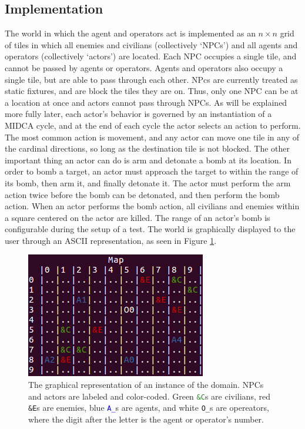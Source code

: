 \documentclass[letterpaper,11pt]{article}
\newcommand{\code}[1]{\texttt{#1}}
\begin{document}
	\subsection{Implementation}
	The world in which the agent and operators act is implemented as an $n \times n$ grid of tiles in which all enemies and civilians (collectively `NPCs') and all agents and operators (collectively `actors') are located. Each NPC occupies a single tile, and cannot be passed by agents or operators. Agents and operators also occupy a single tile, but are able to pass through each other. NPcs are currently treated as static fixtures, and are block the tiles they are on. Thus, only one NPC can be at a location at once and actors cannot pass through NPCs. As will be explained more fully later, each actor's behavior is governed by an instantiation of a MIDCA cycle, and at the end of each cycle the actor selects an action to perform. The most common action is movement, and any actor can move one tile in any of the cardinal directions, so long as the destination tile is not blocked. The other important thing an actor can do is arm and detonate a bomb at its location. In order to bomb a target, an actor must approach the target to within the range of its bomb, then arm it, and finally detonate it. The actor must perform the arm action twice before the bomb can be detonated, and then perform the bomb action. When an actor performs the bomb action, all civilians and enemies within a square centered on the actor are killed. The range of an actor's bomb is configurable during the setup of a test. The world is graphically displayed to the user through an ASCII representation, as seen in Figure \ref{fig:MIDCA_Map_Only}.
	
	\begin{figure}[h]
	\centering
	\includegraphics[width=0.7\linewidth]{figures/MIDCA_Map_Only}
	\caption{The graphical representation of an instance of the domain. NPCs and actors are labeled and color-coded. Green \textcolor{ForestGreen}{\code{\&C}}s are civilians, red \textcolor{BrickRed}{\code{\&E}}s are enemies, blue \textcolor{Blue}{\code{A\_}}s are agents, and white \code{O\_}s are opereators, where the digit after the letter is the agent or operator's number.}
	\label{fig:MIDCA_Map_Only}
	\end{figure}
	
\end{document}
